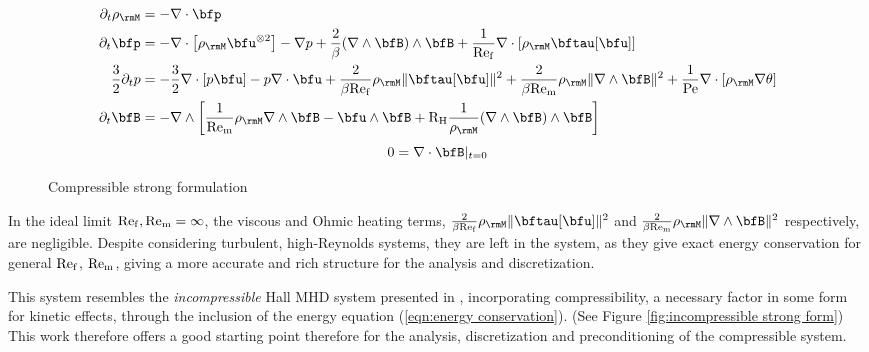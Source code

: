     \begin{figure}
        \centering
        \line
        \begin{align}
            \partial_{t}\rho_{\rmM}  &=  - \nabla\cdot\bfp  \\
            \partial_{t}\bfp  &=  -  \nabla\cdot\left[\rho_{\rmM}\bfu^{\otimes 2}\right] - \nabla p + \frac{2}{\beta}(\nabla\wedge\bfB)\wedge\bfB + \frac{1}{\rmRef}\nabla\cdot[\rho_{\rmM}\bftau[\bfu]]  \\
            \frac{3}{2}\partial_{t}p  &=  - \frac{3}{2}\nabla\cdot[p\bfu] - p\nabla\cdot\bfu + \frac{2}{\beta\rmRef}\rho_{\rmM}\|\bftau[\bfu]\|^{2} + \frac{2}{\beta\rmRem}\rho_{\rmM}\|\nabla\wedge\bfB\|^{2} + \frac{1}{\rmPe}\nabla\cdot[\rho_{\rmM}\nabla\theta]  \\
            \partial_{t}\bfB  &=  - \nabla\wedge\left[\frac{1}{\rmRem}\rho_{\rmM}\nabla\wedge\bfB - \bfu\wedge\bfB + \rmRH\frac{1}{\rho_{\rmM}}(\nabla\wedge\bfB)\wedge\bfB\right]
        \end{align}
        \shortline
        \begin{equation}
            0  =  \nabla\cdot\bfB|_{t = 0}
        \end{equation}
        \line
        \caption{Compressible strong formulation}
        \label{fig:compressible strong form}
    \end{figure}

    In the ideal limit $\mathrm{Re}_{\mathrm{f}}, \mathrm{Re}_{\mathrm{m}}  =  \infty$, the viscous and Ohmic heating terms, $\frac{2}{\beta\rmRef}\rho_{\rmM}\|\bftau[\bfu]\|^{2}$ and $\frac{2}{\beta\rmRem}\rho_{\rmM}\|\nabla\wedge\bfB\|^{2}$ respectively, are negligible. Despite considering turbulent, high-Reynolds systems, they are left in the system, as they give exact energy conservation for general $\mathrm{Re}_{\mathrm{f}}$, $\mathrm{Re}_{\mathrm{m}}$, giving a more accurate and rich structure for the analysis and discretization.

    This system resembles the \emph{incompressible} Hall MHD system presented in \cite{Laakmann_Hu_Farrell_2022}, incorporating compressibility, a necessary factor in some form for kinetic effects, through the inclusion of the energy equation (\ref{eqn:energy conservation}). (See Figure \ref{fig:incompressible strong form}) This work therefore offers a good starting point therefore for the analysis, discretization and preconditioning of the compressible system.

